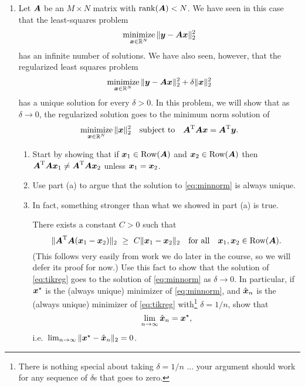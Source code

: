 \documentclass[11pt]{article}
\begin{document}
\begin{enumerate}
\vspace{4mm} 
\item  Let $\boldsymbol{A}$ be an $M\times N$ matrix with $\operatorname{rank}(\boldsymbol{A}) < N$.  We have seen in this case that the least-squares problem
\begin{equation}
	\label{eq:ls}
	\operatorname*{\text{minimize}}_{\boldsymbol{x}\in\mathbb{R}^N} \|\boldsymbol{y}-\boldsymbol{A}\boldsymbol{x}\|_2^2
\end{equation}
has an infinite number of solutions.  We have also seen, however, that the regularized least squares problem
\begin{equation}
	\label{eq:tikreg}
	\operatorname*{\text{minimize}}_{\boldsymbol{x}\in\mathbb{R}^N}\|\boldsymbol{y}-\boldsymbol{A}\boldsymbol{x}\|_2^2 + \delta\|\boldsymbol{x}\|_2^2
\end{equation}
has a unique solution for every $\delta > 0$.  In this problem, we will show that as $\delta\rightarrow 0$, the regularized solution goes to the minimum norm solution of
\begin{equation}
	\label{eq:minnorm}
	\operatorname*{\text{minimize}}_{\boldsymbol{x}\in\mathbb{R}^N}\|\boldsymbol{x}\|_2^2\quad\text{subject to}\quad \boldsymbol{A}^{\mathrm{T}}\boldsymbol{A}\boldsymbol{x} = \boldsymbol{A}^{\mathrm{T}}\boldsymbol{y}.
\end{equation}
\begin{enumerate}
	\item Start by showing that if $\boldsymbol{x}_1\in\operatorname{Row}(\boldsymbol{A})$ and $\boldsymbol{x}_2\in\operatorname{Row}(\boldsymbol{A})$ then $\boldsymbol{A}^{\mathrm{T}}\boldsymbol{A}\boldsymbol{x}_1\not=\boldsymbol{A}^{\mathrm{T}}\boldsymbol{A}\boldsymbol{x}_2$ unless $\boldsymbol{x}_1=\boldsymbol{x}_2$.
	\item Use part (a) to argue that the solution to \eqref{eq:minnorm} is always unique.
	\item In fact, something stronger than what we showed in part (a) is true. 	
	
	There exists a constant $C>0$ such that
	\[
		\|\boldsymbol{A}^{\mathrm{T}}\boldsymbol{A}(\boldsymbol{x}_1-\boldsymbol{x}_2)\|_2 ~\geq~ C\|\boldsymbol{x}_1-\boldsymbol{x}_2\|_2\quad\text{for all}\quad \boldsymbol{x}_1,\boldsymbol{x}_2\in\operatorname{Row}(\boldsymbol{A}).
	\]
	(This follows very easily from work we do later in the course, so we will defer its proof for now.)  Use this fact to show that the solution of \eqref{eq:tikreg} goes to the solution of \eqref{eq:minnorm} as $\delta\rightarrow 0$.  In particular, if $\boldsymbol{x}^\star$ is the (always unique) minimizer of \eqref{eq:minnorm}, and $\hat{\boldsymbol{x}}_n$ is the (always unique) minimizer of \eqref{eq:tikreg} with\footnote{There is nothing special about taking $\delta=1/n$ ... your argument should work for any sequence of $\delta$s that goes to zero.} $\delta = 1/n$, show that
\[
	\lim_{n\rightarrow\infty}\hat{\boldsymbol{x}}_n = \boldsymbol{x}^\star,
\]
i.e.\ $\lim_{n\rightarrow\infty}\|\boldsymbol{x}^\star-\hat{\boldsymbol{x}}_n\|_2 = 0$.
\end{enumerate}
	





\end{enumerate}
\end{document}
